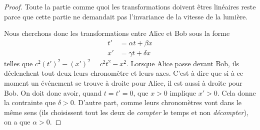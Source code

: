 \begin{proof}
	Toute la partie comme quoi les transformations doivent êtres linéaires reste parce que cette partie ne demandait pas l'invariance de la vitesse de la lumière. 
    
    Nous cherchons donc les transformations entre Alice et Bob sous la forme
	\[ 
	\begin{split}
		t'&=\alpha t+\beta x\\
		x'&=\gamma t+\delta x
	\end{split}  
	\]
	telles que $c^2(t')^2-(x')^2=c^2t^2-x^2$. Lorsque Alice passe devant Bob, ils déclenchent tout deux leurs chronomètre et leurs axes. C'est à dire que si à ce moment un événement se trouve à droite pour Alice, il est aussi à droite pour Bob. On doit donc avoir, quand $t=t'=0$, que $x>0$ implique $x'>0$. Cela donne la contrainte que $\delta>0$. D'autre part, comme leurs chronomètres vont dans le même sens (ils choisissent tout les deux de \emph{compter} le temps et non \emph{décompter}), on a que $\alpha>0$.


\end{proof}
